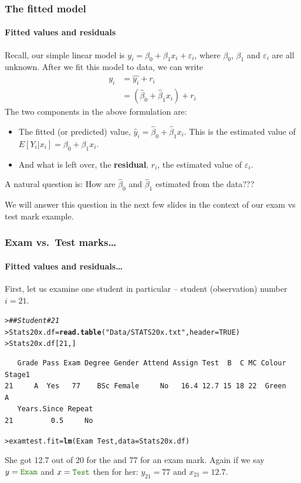 \documentclass{beamer}\usepackage[]{graphicx}\usepackage[]{xcolor}
\makeatletter
\newcommand{\hlnum}[1]{\textcolor[rgb]{0.686,0.059,0.569}{#1}}%
\newcommand{\hlstr}[1]{\textcolor[rgb]{0.192,0.494,0.8}{#1}}%
\newcommand{\hlcom}[1]{\textcolor[rgb]{0.678,0.584,0.686}{\textit{#1}}}%
\newcommand{\hlopt}[1]{\textcolor[rgb]{0,0,0}{#1}}%
\newcommand{\hlstd}[1]{\textcolor[rgb]{0.345,0.345,0.345}{#1}}%
\newcommand{\hlkwb}[1]{\textcolor[rgb]{0.69,0.353,0.396}{#1}}%
\newcommand{\hlkwc}[1]{\textcolor[rgb]{0.333,0.667,0.333}{#1}}%
\newcommand{\hlkwd}[1]{\textcolor[rgb]{0.737,0.353,0.396}{\textbf{#1}}}%
\newenvironment{kframe}{%
 \def\at@end@of@kframe{}%
 \ifinner\ifhmode%
  \def\at@end@of@kframe{\end{minipage}}%
  \begin{minipage}{\columnwidth}%
 \fi\fi%
 \def\FrameCommand##1{\hskip\@totalleftmargin \hskip-\fboxsep
 \colorbox{shadecolor}{##1}\hskip-\fboxsep
     \hskip-\linewidth \hskip-\@totalleftmargin \hskip\columnwidth}%
 \MakeFramed {\advance\hsize-\width
   \@totalleftmargin\z@ \linewidth\hsize
   \@setminipage}}%
 {\par\unskip\endMakeFramed%
 \at@end@of@kframe}
\newenvironment{knitrout}{}{} %
\makeatother
\begin{document}
\begin{frame}[fragile,t]
\frametitle{The fitted model}
\framesubtitle{Fitted values and residuals}
Recall, our simple linear model is $y_i=\beta_0+\beta_1 x_i+\varepsilon_i$, where $\beta_0$, $\beta_1$ and $\varepsilon_i$ are all unknown. After we fit this model to data, we can write
\begin{align*}
y_i &=\hat{y_i} + r_i \\
&= \left(\hat{\beta}_0+\hat{\beta}_1x_i\right)+r_i
\end{align*}
The two components in the above formulation are: 
\begin{itemize}
\item The fitted (or predicted) value, $\hat{y}_i=\hat{\beta}_0+\hat{\beta}_1 x_i$. 
This is the estimated value of $E[Y_i|x_i]=\beta_0+\beta_1 x_i$.
\item And what is left over, the {\bf residual}, $r_i$, the estimated value of $\varepsilon_i$. 
\end{itemize}

A natural question is: How are $\hat{\beta}_0$ and $\hat{\beta}_1$ estimated from the data???

We will answer this question in the next few slides in the context of our exam vs test mark example.
\end{frame}



\begin{frame}[fragile]
\frametitle{Exam vs.\ Test marks\ldots}
\framesubtitle{Fitted values and residuals\ldots}

First, let us examine one student in particular -- student (observation) number $i=21$.
\begin{knitrout}\scriptsize
{}\color{fgcolor}\begin{kframe}
\begin{alltt}
\hlstd{> }\hlcom{## Student # 21}
\hlstd{> }\hlstd{Stats20x.df} \hlkwb{=} \hlkwd{read.table}\hlstd{(}\hlstr{"Data/STATS20x.txt"}\hlstd{,} \hlkwc{header}\hlstd{=}\hlnum{TRUE}\hlstd{)}
\hlstd{> }\hlstd{Stats20x.df[}\hlnum{21}\hlstd{,]}
\end{alltt}
\begin{verbatim}
   Grade Pass Exam Degree Gender Attend Assign Test  B  C MC Colour Stage1
21     A  Yes   77    BSc Female     No   16.4 12.7 15 18 22  Green      A
   Years.Since Repeat
21         0.5     No
\end{verbatim}
\begin{alltt}
\hlstd{> }\hlstd{examtest.fit} \hlkwb{=} \hlkwd{lm}\hlstd{(Exam} \hlopt{~} \hlstd{Test,} \hlkwc{data} \hlstd{= Stats20x.df)}
\end{alltt}
\end{kframe}
\end{knitrout}

She got 12.7 out of 20 for the  and 77 for an exam mark.
Again if we say $y=\rcode{Exam}$ and $x=\rcode{Test}$ then for her: 
$y_{21}=77$  and $x_{21} = 12.7$.

\end{frame}
\end{document}
